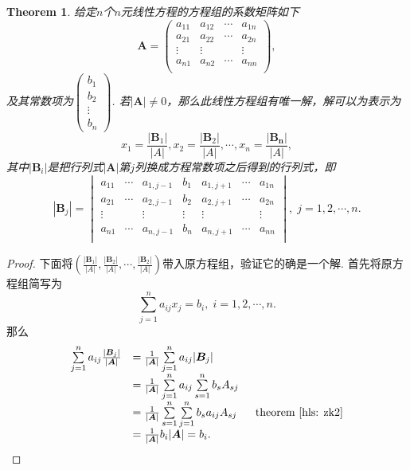 \documentclass{article}
\newtheorem{theorem}{Theorem}[section]
\newcommand{\mbf}[1]{\bm{#1}}
\begin{document}
\begin{theorem}
\rm 给定$n$个$n$元线性方程的方程组的系数矩阵如下
$$
\mbf{A}=
\begin{pmatrix}
a_{11} & a_{12} & \cdots & a_{1n} \\
a_{21} & a_{22} & \cdots & a_{2n} \\
\vdots & \vdots & 		 & \vdots \\
a_{n1} & a_{n2} & \cdots & a_{nn} \\
\end{pmatrix},
$$
及其常数项为$\begin{pmatrix}b_1 \\ b_2 \\ \vdots \\b_n \end{pmatrix}$. 若$|\mbf{A}| \neq 0$，那么此线性方程组有唯一解，解可以为表示为
$$
x_1 = \frac{|\mbf{B}_1|}{|A|},x_2 = \frac{|\mbf{B}_2|}{|A|},\cdots, x_n = \frac{|\mbf{B_n}|}{|A|},
$$
其中$|\mbf{B}_i|$是把行列式$|\mbf{A}|$第$j$列换成方程常数项之后得到的行列式，即
$$
|\mbf{B}_j| = 
\begin{vmatrix}
a_{11} & \cdots & a_{1,j-1}  & b_1 & a_{1,j+1} & \cdots & a_{1n} \\
a_{21} & \cdots & a_{2,j-1}  & b_2 & a_{2,j+1} & \cdots & a_{2n} \\
\vdots &  & \vdots & \vdots &  \vdots & & \vdots \\
a_{n1} & \cdots & a_{n,j-1}  & b_n & a_{n,j+1} & \cdots & a_{nn} \\
\end{vmatrix},\; j=1,2,\cdots,n.
$$

\end{theorem}


\begin{proof}
下面将$(\frac{|\mbf{B}_1|}{|A|},\frac{|\mbf{B}_2|}{|A|},\cdots,\frac{|\mbf{B}_2|}{|A|})$带入原方程组，验证它的确是一个解. 首先将原方程组简写为
$$
\sum\limits_{j=1}^n a_{ij}x_j = b_i , \; i = 1,2,\cdots,n.
$$
那么
$$
\begin{array}{ll}
\sum\limits_{j=1}^n a_{ij}\frac{|\mbf{B}_j|}{|\mbf{A}|} &= \frac{1}{|\mbf{A}|}\sum\limits_{j=1}^n a_{ij}|\mbf{B}_j| \\
&= \frac{1}{|\mbf{A}|}\sum\limits_{j=1}^n a_{ij}\sum\limits_{s=1}^n b_sA_{sj} \\
&= \frac{1}{|\mbf{A}|}\sum\limits_{s=1}^n\sum\limits_{j=1}^n b_sa_{ij}A_{sj} ~  ~ ~ ~ ~\text{theorem \ref{hls: zk2}}\\ 
&= \frac{1}{|\mbf{A}|} b_i |\mbf{A}| = b_i.
\end{array}
$$
\end{proof}
\end{document}
